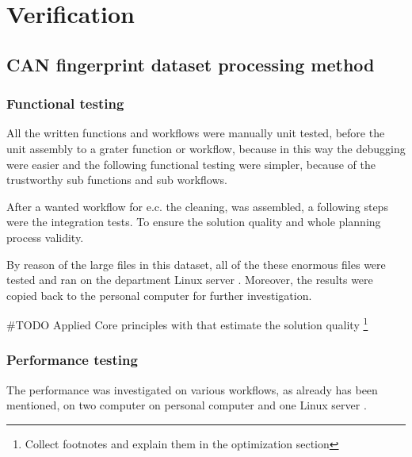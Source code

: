 \chapter{Verification}
\section{CAN fingerprint dataset processing method}
\subsection{Functional testing}
All the written functions and workflows were manually unit tested, before the unit assembly to a grater function or workflow, because in this way the debugging were easier and the following functional testing were simpler, because of the trustworthy sub functions and sub workflows.

After a wanted workflow for e.c. the cleaning, was assembled, a following steps were the integration tests. To ensure the solution quality and whole planning process validity.

By reason of the large files in this dataset, all of the these enormous files were tested and ran on the department Linux server \cite{Batman}.
Moreover, the results were copied back to the personal computer for further investigation.

\#TODO Applied Core principles with that estimate the solution quality
\footnote{Collect footnotes and explain them in the optimization section}
\subsection{Performance testing}
The performance was investigated on various workflows, as already has been mentioned, on two computer on personal computer \cite{Latitude} and one Linux server \cite{Batman}.

